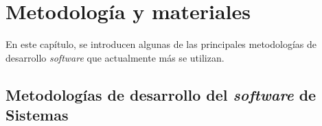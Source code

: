 \chapter{Metodología y materiales}
\label{chapter:metodologia}

En este capítulo, se introducen algunas de las principales metodologías de desarrollo \textit{software} que actualmente más se utilizan.

\section{Metodologías de desarrollo del \textit{software} de Sistemas}


%            


